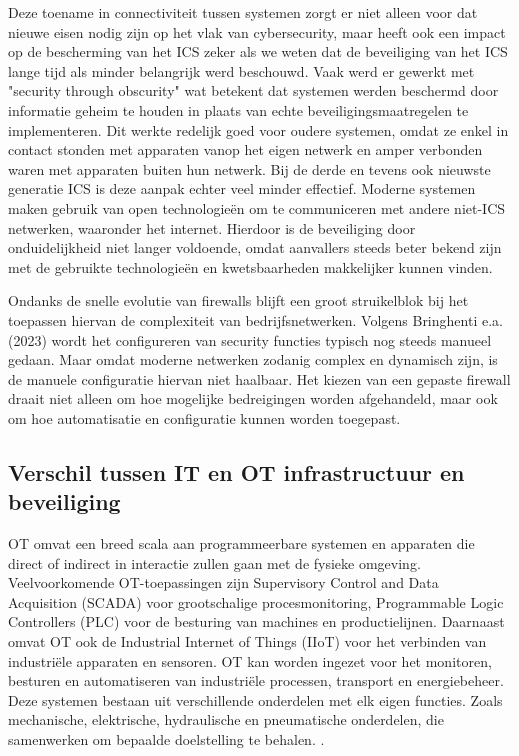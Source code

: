 Deze toename in connectiviteit tussen systemen zorgt er niet alleen voor dat nieuwe eisen nodig zijn op het vlak van cybersecurity, maar heeft ook een impact op de bescherming van het ICS zeker als we weten dat de beveiliging van het ICS lange tijd als minder belangrijk werd beschouwd. Vaak werd er gewerkt met "security through obscurity" wat betekent dat systemen werden beschermd door informatie geheim te houden in plaats van echte beveiligingsmaatregelen te implementeren. Dit werkte redelijk goed voor oudere systemen, omdat ze enkel in contact stonden met apparaten vanop het eigen netwerk en amper verbonden waren met apparaten buiten hun netwerk. Bij de derde en tevens ook nieuwste generatie ICS is deze aanpak echter veel minder effectief. Moderne systemen maken gebruik van open technologieën om te communiceren met andere niet-ICS netwerken, waaronder het internet. Hierdoor is de beveiliging door onduidelijkheid niet langer voldoende, omdat aanvallers steeds beter bekend zijn met de gebruikte technologieën en kwetsbaarheden makkelijker kunnen vinden. \autocite{knowles2015}

Ondanks de snelle evolutie van firewalls blijft een groot struikelblok bij het toepassen hiervan de complexiteit van bedrijfsnetwerken. Volgens Bringhenti e.a. (2023) wordt het configureren van security functies typisch nog steeds manueel gedaan. Maar omdat moderne netwerken zodanig complex en dynamisch zijn, is de manuele configuratie hiervan niet haalbaar. Het kiezen van een gepaste firewall draait niet alleen om hoe mogelijke bedreigingen worden afgehandeld, maar ook om hoe automatisatie en configuratie kunnen worden toegepast.


\subsection{Verschil tussen IT en OT infrastructuur en beveiliging}

OT omvat een breed scala aan programmeerbare systemen en apparaten die direct of indirect in interactie zullen gaan met de fysieke omgeving. Veelvoorkomende OT-toepassingen zijn Supervisory Control and Data Acquisition (SCADA) voor grootschalige procesmonitoring, Programmable Logic Controllers (PLC) voor de besturing van machines en productielijnen. Daarnaast omvat OT ook de Industrial Internet of Things (IIoT) voor het verbinden van industriële apparaten en sensoren. OT kan worden ingezet voor het monitoren, besturen en automatiseren van industriële processen, transport en energiebeheer. Deze systemen bestaan uit verschillende onderdelen met elk eigen functies. Zoals mechanische, elektrische, hydraulische en pneumatische onderdelen, die samenwerken om bepaalde doelstelling te behalen. \autocite{Stouffer2023}.

